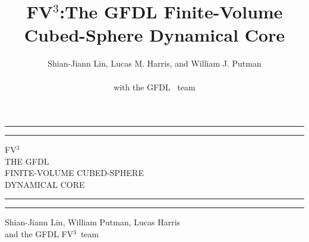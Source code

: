 \documentclass[12pt,letterpaper]{book}
\title{FV$^3$:The GFDL Finite-Volume Cubed-Sphere Dynamical Core}
\author{Shian-Jiann Lin, Lucas M. Harris, and William J. Putman\\ \\ with the GFDL \fv\ team}%
\newcommand{\fv}{FV$^{\mathrm{3}}$}
\begin{document}
\begin{titlepage} %

	\centering %
	
	\scshape %
	
	\vspace*{\baselineskip} %
	
	
	\rule{\textwidth}{1.6pt}\vspace*{-\baselineskip}\vspace*{2pt} %
	\rule{\textwidth}{0.4pt} %
	
	\vspace{0.75\baselineskip} %
	 
	{\LARGE { \huge \fv  } \\  THE GFDL  \\ FINITE-VOLUME CUBED-SPHERE\\ DYNAMICAL CORE\\} %
	
	\vspace{0.75\baselineskip} %
	
	\rule{\textwidth}{0.4pt}\vspace*{-\baselineskip}\vspace{3.2pt} %
	\rule{\textwidth}{1.6pt} %
	
	\vspace{2\baselineskip} %
	
	Shian-Jiann Lin, William Putman, Lucas Harris \\
	\vspace{0.75\baselineskip} %
	and the GFDL \fv\ team
	\vspace{0.75\baselineskip} %
	
	
	\vspace*{3\baselineskip} %
	
	

\end{titlepage}
\end{document}
